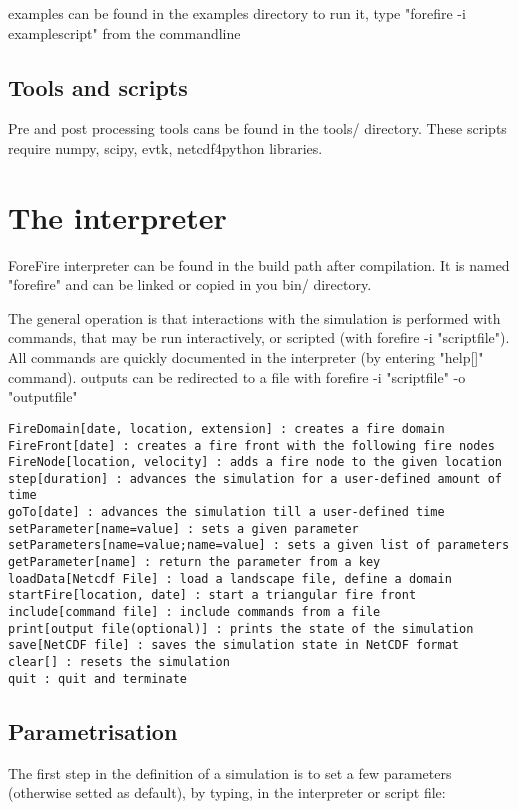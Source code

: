 examples can be found in the examples directory
to run it, type "forefire -i examplescript" from the commandline

\section{Tools and scripts}

Pre and post processing tools cans be found in the tools/ directory.
These scripts require numpy, scipy, evtk, netcdf4python libraries.


\chapter{The interpreter}
ForeFire interpreter can be found in the build path after compilation.
It is named "forefire" and can be linked or copied in you bin/ directory.

The general operation is that interactions with the simulation is performed with commands, that may be run interactively, or scripted (with forefire -i "scriptfile"). All commands are quickly documented in the interpreter (by entering "help[]" command).
outputs can be redirected to a file with forefire -i "scriptfile" -o "outputfile"

\begin{verbatim}
FireDomain[date, location, extension] : creates a fire domain
FireFront[date] : creates a fire front with the following fire nodes
FireNode[location, velocity] : adds a fire node to the given location
step[duration] : advances the simulation for a user-defined amount of time
goTo[date] : advances the simulation till a user-defined time
setParameter[name=value] : sets a given parameter
setParameters[name=value;name=value] : sets a given list of parameters
getParameter[name] : return the parameter from a key
loadData[Netcdf File] : load a landscape file, define a domain
startFire[location, date] : start a triangular fire front
include[command file] : include commands from a file
print[output file(optional)] : prints the state of the simulation
save[NetCDF file] : saves the simulation state in NetCDF format
clear[] : resets the simulation
quit : quit and terminate
\end{verbatim}


\section{Parametrisation}
The first step in the definition of a simulation is to set a few parameters (otherwise setted as default), by typing, in the interpreter or script file:

